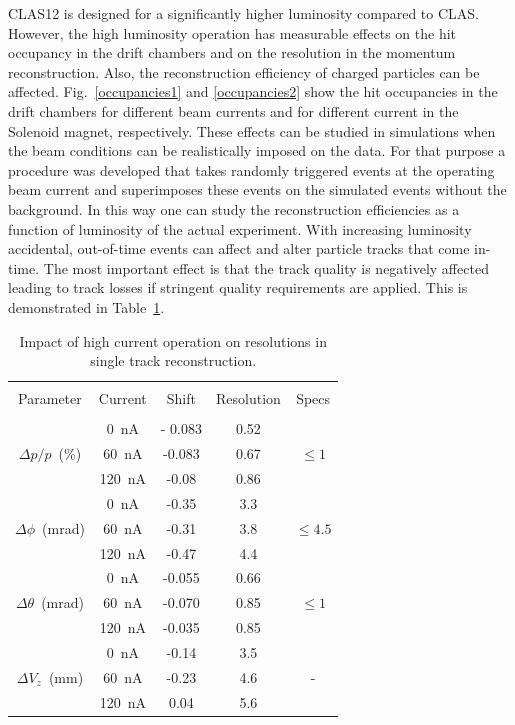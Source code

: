 \documentclass[final,3p,times,twocolumn,authoryear]{elsarticle}
\begin{document}
CLAS12 is designed for a significantly higher luminosity compared to CLAS. However, the high luminosity operation 
has measurable effects on the hit occupancy in the drift chambers and on the resolution in the momentum reconstruction.
Also, the reconstruction efficiency of charged particles can be affected. Fig.~\ref{occupancies1} and \ref{occupancies2}
show the hit occupancies in the drift chambers for different beam currents and for different current in the Solenoid magnet,
respectively. These effects can be studied in simulations when the beam conditions can be realistically imposed on the data.
For that purpose a procedure was developed that takes randomly triggered events at the operating beam current and
superimposes these events on the simulated events without the background. In this way one can study the reconstruction
efficiencies as a function of luminosity of the actual experiment. With increasing luminosity accidental, out-of-time events can
affect and alter particle tracks that come in-time. The most important effect is that the track quality is negatively affected
leading to track losses if stringent quality requirements are applied. This is demonstrated in Table~\ref{resolution}.    

\begin{table}[htbp!]
\caption{Impact of high current operation on resolutions in single track reconstruction.}     
\vspace{0.2cm}\label{resolution}
\small
\begin{tabular}{|c|c|c|c|c|}
\hline
&&&&\\
Parameter & Current &Shift & Resolution &Specs\\
&&&&\\
\hline
& 0~nA & - 0.083 & 0.52 & \\
$\Delta{p}/p$~(\%) &60~nA & -0.083 & 0.67& $\le 1$\\
& 120~nA & -0.08 & 0.86 &  \\
\hline 
&0~nA & -0.35 & 3.3 &  \\
$\Delta \phi$~(mrad) & 60~nA & -0.31& 3.8 &  $\le 4.5$\\
&120~nA & -0.47 & 4.4 &  \\
\hline
&0~nA & -0.055 & 0.66 &  \\
$\Delta \theta$~(mrad)& 60~nA & -0.070 & 0.85 &  $\le 1$\\
&120~nA & -0.035 & 0.85 &  \\
\hline
& 0~nA & -0.14 & 3.5 &  \\
$\Delta{V_z}$~(mm) & 60~nA & -0.23 & 4.6 & -  \\
& 120~nA & 0.04 & 5.6 & \\
\hline
\end{tabular}
\end{table}
\end{document}

